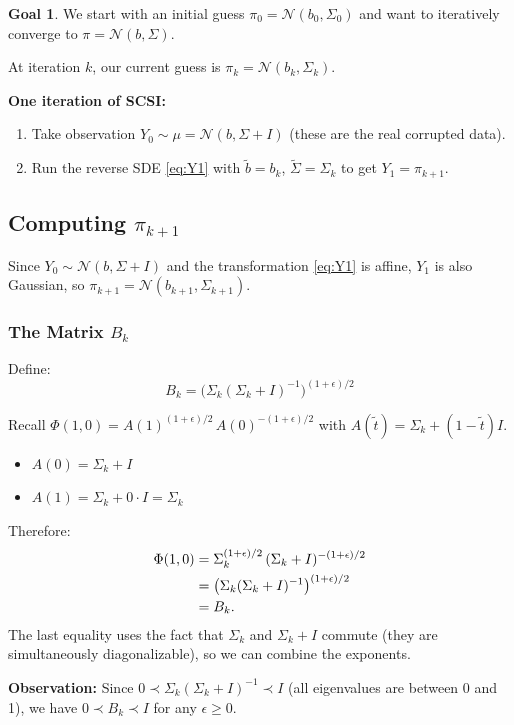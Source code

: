 \documentclass[11pt, a4paper]{article}
\theoremstyle{definition}
\newtheorem{goal}{Goal}
\begin{document}
\begin{goal}
We start with an initial guess $\pi_0 = \mathcal{N}(b_0, \Sigma_0)$ and want to iteratively converge to $\pi = \mathcal{N}(b, \Sigma)$.
\end{goal}

At iteration $k$, our current guess is $\pi_k = \mathcal{N}(b_k, \Sigma_k)$.

\medskip\noindent\textbf{One iteration of SCSI:}
\begin{enumerate}
    \item Take observation $Y_0 \sim \mu = \mathcal{N}(b, \Sigma+I)$ (these are the real corrupted data).
    \item Run the reverse SDE \eqref{eq:Y1} with $\tilde{b} = b_k$, $\tilde{\Sigma} = \Sigma_k$ to get $Y_1 = \pi_{k+1}$.
\end{enumerate}

\subsection{Computing $\pi_{k+1}$}

Since $Y_0 \sim \mathcal{N}(b, \Sigma + I)$ and the transformation \eqref{eq:Y1} is affine, $Y_1$ is also Gaussian, so $\pi_{k+1} = \mathcal{N}(b_{k+1}, \Sigma_{k+1})$.

\subsubsection{The Matrix $B_k$}

Define:
\[
    \boxed{\;B_k = \bigl(\Sigma_k(\Sigma_k + I)^{-1}\bigr)^{(1+\epsilon)/2}\;}
\]

\begin{calculation}[title={Where does $B_k$ come from?}]
Recall $\Phi(1,0) = A(1)^{(1+\epsilon)/2}\,A(0)^{-(1+\epsilon)/2}$ with $A(\tilde{t}) = \Sigma_k + (1-\tilde{t})I$.

\begin{itemize}
    \item $A(0) = \Sigma_k + I$
    \item $A(1) = \Sigma_k + 0 \cdot I = \Sigma_k$
\end{itemize}

Therefore:
\begin{align}
    \Phi(1,0) &= \Sigma_k^{(1+\epsilon)/2}\,(\Sigma_k + I)^{-(1+\epsilon)/2} \notag \\
              &= \bigl(\Sigma_k(\Sigma_k+I)^{-1}\bigr)^{(1+\epsilon)/2} \notag \\
              &= B_k. \notag
\end{align}
The last equality uses the fact that $\Sigma_k$ and $\Sigma_k + I$ commute (they are simultaneously diagonalizable), so we can combine the exponents.

\medskip
\textbf{Observation:} Since $0 \prec \Sigma_k(\Sigma_k+I)^{-1} \prec I$ (all eigenvalues are between 0 and 1), we have $0 \prec B_k \prec I$ for any $\epsilon \geq 0$.
\end{calculation}
\end{document}
